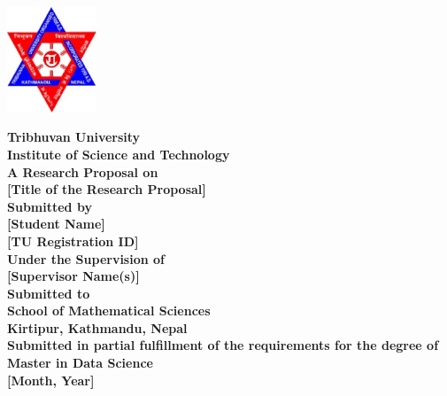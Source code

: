 \documentclass[12pt, a4paper]{report}
\begin{document}
\begin{titlepage}
    \begin{center}
        \includegraphics[width=0.2\textwidth]{assets/logo.eps}\\[0.5cm] %
        \vspace{0.5cm}
        
        {\Large \textbf{Tribhuvan University}}\\
        {\Large \textbf{Institute of Science and Technology}}\\[1.0cm]

        {\large \textbf{A Research Proposal on}}\\

        {\Large \textbf{[Title of the Research Proposal]}}\\[1.0cm]

        \textbf{Submitted by}\\
        {\large \textbf{[Student Name]}}\\
        \textbf{[TU Registration ID]}\\[1cm]

        \textbf{Under the Supervision of}\\
        {\large \textbf{[Supervisor Name(s)]}}\\[1cm]

        \textbf{Submitted to}\\
        {\large \textbf{School of Mathematical Sciences}}\\
        {\large \textbf{Kirtipur, Kathmandu, Nepal}}\\[1cm]

        \textbf{Submitted in partial fulfillment of the requirements for the degree of Master in Data Science}\\[2cm]

        \textbf{[Month, Year]}\\
    \end{center}
\end{titlepage}

\tableofcontents

\pagestyle{plain}
\end{document}

